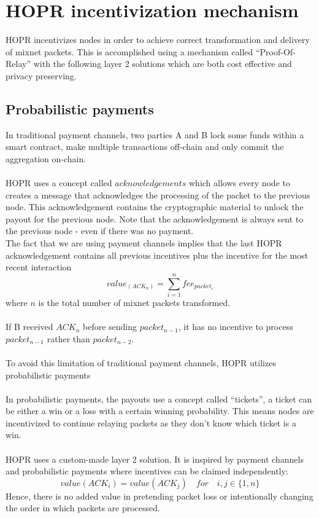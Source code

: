 \section{HOPR incentivization mechanism}
HOPR incentivizes nodes in order to achieve correct transformation and delivery of mixnet packets.
This is accomplished using a mechanism called “Proof-Of-Relay” with the following layer 2 solutions which are both cost effective and privacy preserving.

\subsection{Probabilistic payments}
In traditional payment channels, two parties A and B lock some funds within a smart contract, make multiple transactions off-chain and only commit the aggregation on-chain.
\\~\\HOPR uses a concept called $acknowledgements$ which allows every node to creates a message that acknowledges the processing of the packet to the previous node. This acknowledgement contains the cryptographic material to unlock the payout for the previous node. Note that the acknowledgement is always sent to the previous node - even if there was no payment.
\\The fact that we are using payment channels implies that the last HOPR acknowledgement contains all previous incentives plus the incentive for the most recent interaction
$$value_(ACK_n) =\sum_{i=1}^nfee_{packet_i}$$ where $n$ is the total number of mixnet packets transformed.
\\~\\If B received $ACK_n$ before sending $packet_{n-1}$, it has no incentive to process $packet_{n-1}$ rather than $packet_{n-2}$.
\\~\\To avoid this limitation of traditional payment channels, HOPR utilizes probabilistic payments
\\~\\In probabilistic payments, the payouts use a concept called “tickets”, a ticket can be either a win or a loss with a certain winning probability. This means nodes are incentivized to continue relaying packets as they don’t know which ticket is a win.
\\~\\HOPR uses a custom-made layer 2 solution. It is inspired by payment channels and probabilistic payments where incentives can be claimed independently:
$$value ( ACK_i )=value ( ACK_j ) \quad for \quad i,j\in \{1,n\}$$
Hence, there is no added value in pretending packet loss or intentionally changing the order in which packets are processed. 
